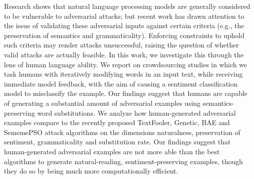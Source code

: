 Research shows that natural language processing models are generally considered to be vulnerable to adversarial attacks; but recent work has drawn attention to the issue of validating these adversarial inputs against certain criteria (e.g., the preservation of semantics and grammaticality). Enforcing constraints to uphold such criteria may render attacks unsuccessful, raising the question of whether valid attacks are actually feasible. In this work, we investigate this through the lens of human language ability. We report on crowdsourcing studies in which we task humans with iteratively modifying words in an input text, while receiving immediate model feedback, with the aim of causing a sentiment classification model to misclassify the example. Our findings suggest that humans are capable of generating a substantial amount of adversarial examples using semantics-preserving word substitutions. We analyze how human-generated adversarial examples compare to the recently proposed TextFooler, Genetic, BAE and SememePSO attack algorithms on the dimensions naturalness, preservation of sentiment, grammaticality and substitution rate. Our findings suggest that human-generated adversarial examples are not more able than the best algorithms to generate natural-reading, sentiment-preserving examples, though they do so by being much more computationally efficient.
